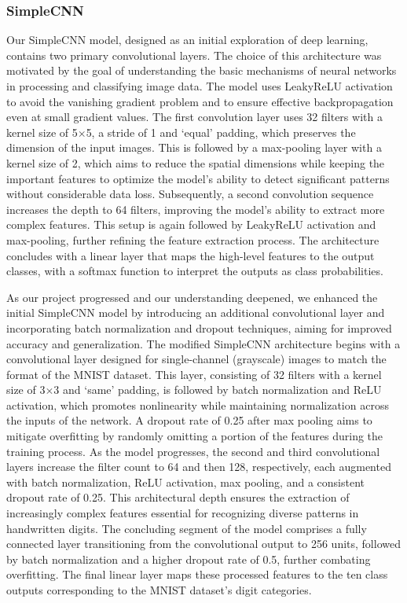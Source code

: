 \subsubsection{SimpleCNN}\label{simplecnn}

Our SimpleCNN model, designed as an initial exploration of deep learning, contains two primary convolutional layers. The choice of this architecture was motivated by the goal of understanding the basic mechanisms of neural networks in processing and classifying image data. The model uses LeakyReLU activation to avoid the vanishing gradient problem and to ensure effective backpropagation even at small gradient values. The first convolution layer uses 32 filters with a kernel size of 5$\times$5, a stride of 1 and `equal' padding, which preserves the dimension of the input images. This is followed by a max-pooling layer with a kernel size of 2, which aims to reduce the spatial dimensions while keeping the important features to optimize the model's ability to detect significant patterns without considerable data loss. Subsequently, a second convolution sequence increases the depth to 64 filters, improving the model's ability to extract more complex features. This setup is again followed by LeakyReLU activation and max-pooling, further refining the feature extraction process. The architecture concludes with a linear layer that maps the high-level features to the output classes, with a softmax function to interpret the outputs as class probabilities.

As our project progressed and our understanding deepened, we enhanced the initial SimpleCNN model by introducing an additional convolutional layer and incorporating batch normalization and dropout techniques, aiming for improved accuracy and generalization. The modified SimpleCNN architecture begins with a convolutional layer designed for single-channel (grayscale) images to match the format of the MNIST dataset. This layer, consisting of 32 filters with a kernel size of 3$\times$3 and `same' padding, is followed by batch normalization and ReLU activation, which promotes nonlinearity while maintaining normalization across the inputs of the network. A dropout rate of 0.25 after max pooling aims to mitigate overfitting by randomly omitting a portion of the features during the training process. As the model progresses, the second and third convolutional layers increase the filter count to 64 and then 128, respectively, each augmented with batch normalization, ReLU activation, max pooling, and a consistent dropout rate of 0.25. This architectural depth ensures the extraction of increasingly complex features essential for recognizing diverse patterns in handwritten digits. The concluding segment of the model comprises a fully connected layer transitioning from the convolutional output to 256 units, followed by batch normalization and a higher dropout rate of 0.5, further combating overfitting. The final linear layer maps these processed features to the ten class outputs corresponding to the MNIST dataset's digit categories.

